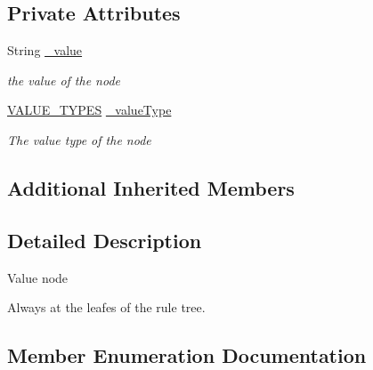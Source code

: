 \subsection*{Private Attributes}
\begin{DoxyCompactItemize}
\item 
String \hyperlink{class_web_analyzer_1_1_models_1_1_settings_model_1_1_expression_tree_1_1_value_node_a2a3fb6174add907e160cef8eb0088d1c}{\+\_\+value}
\begin{DoxyCompactList}\small\item\em the value of the node \end{DoxyCompactList}\item 
\hyperlink{class_web_analyzer_1_1_models_1_1_settings_model_1_1_expression_tree_1_1_value_node_ac18254d82bd6e0d754ed1a2484882d11}{V\+A\+L\+U\+E\+\_\+\+T\+Y\+P\+E\+S} \hyperlink{class_web_analyzer_1_1_models_1_1_settings_model_1_1_expression_tree_1_1_value_node_a79b9df583576bec1fd1916ffb8613642}{\+\_\+value\+Type}
\begin{DoxyCompactList}\small\item\em The value type of the node \end{DoxyCompactList}\end{DoxyCompactItemize}
\subsection*{Additional Inherited Members}


\subsection{Detailed Description}
Value node 

Always at the leafes of the rule tree. 

\subsection{Member Enumeration Documentation}
\hypertarget{class_web_analyzer_1_1_models_1_1_settings_model_1_1_expression_tree_1_1_value_node_ac18254d82bd6e0d754ed1a2484882d11}{}
